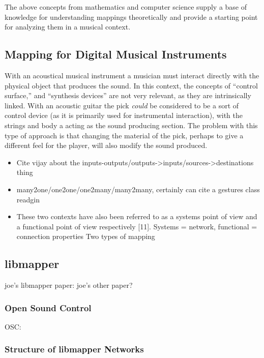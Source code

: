 The above concepts from mathematics and computer science supply a base of knowledge for understanding mappings theoretically and provide a starting point for analyzing them in a musical context.

	\subsection{Mapping for Digital Musical Instruments} \label{sec:mappingforDMIs}

With an acoustical musical instrument a musician must interact directly with the physical object that produces the sound. In this context, the concepts of ``control surface,'' and ``synthesis devices'' are not very relevant, as they are intrinsically linked. With an acoustic guitar the pick \emph{could} be considered to be a sort of control device (as it is primarily used for instrumental interaction), with the strings and body a acting as the sound producing section. The problem with this type of approach is that changing the material of the pick, perhaps to give a different feel for the player, will also modify the sound produced.

	\begin{itemize}
		\item Cite vijay about the inputs-outputs/outputs->inputs/sources->destinations thing
		\item many2one/one2one/one2many/many2many, certainly can cite a gestures class readgin 
		\item These two contexts have also been referred to as a systems point of view and a functional point of view respectively [11].  Systems = network, functional = connection properties Two types of mapping \cite{two_types_of_mapping}
	\end{itemize}
\subsection{libmapper}
	joe's libmapper paper: 
	joe's other paper?
	\subsubsection{Open Sound Control}
	OSC: 
	\subsubsection{Structure of libmapper Networks}
